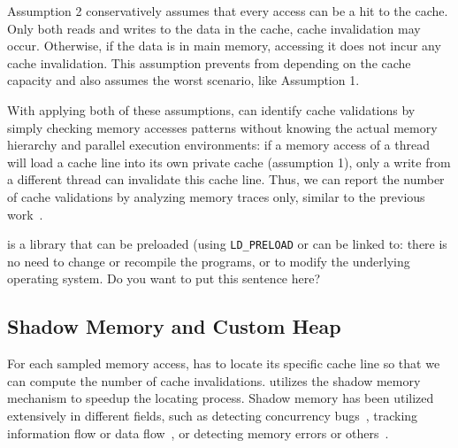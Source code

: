 Assumption 2 conservatively assumes that every access can be a hit to the cache. Only both reads and writes to the data in the cache, cache invalidation may occur. Otherwise, if the data is in main memory, accessing it does not incur any cache invalidation. This assumption prevents \cheetah{} from depending on the cache capacity and also assumes the worst scenario, like Assumption 1.

With applying both of these assumptions, \cheetah{} can identify cache validations by simply checking memory accesses patterns without knowing the actual memory hierarchy and parallel execution environments: if a memory access of a thread will load a cache line into its own private cache (assumption 1), only a write from a different thread can invalidate this cache line. Thus, we can report the number of cache validations by analyzing memory traces only, similar to the previous work~\cite{Predator, qinzhao}. 

{\color{red}\Cheetah{} is a library that can be preloaded (using \texttt{LD\_PRELOAD} or can be linked to: there is no need to change or recompile the programs, or to modify the underlying operating system. } {\color{blue} Do you want to put this sentence here?}

 

\subsection{Shadow Memory and Custom Heap}

For each sampled memory access, \cheetah{} has to locate its specific cache line so that we can compute the number of cache invalidations. \Cheetah{} utilizes the shadow memory mechanism to speedup the locating process. Shadow memory has been utilized extensively in different fields, such as detecting concurrency bugs~\cite{Harrow:2000:RCM:645880.672080, helgrind, 404681, Savage:1997:EDD:268998.266641}, tracking information flow or data flow~\cite{Cheng:2006:TEF:1157733.1157903, Newsome05dynamictaint, Qin:2006:LLP:1194816.1194834}, or detecting memory errors or others~\cite{qinzhao, Hastings91purify:fast, Seward:2005:UVD:1247360.1247362, Narayanasamy:2006:ALO:1140277.1140303}.  

